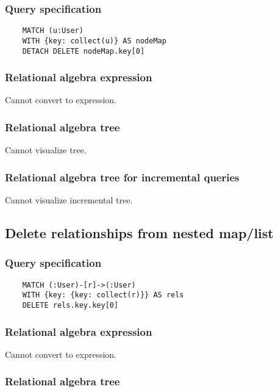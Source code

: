 	\subsubsection*{Query specification}

	\begin{lstlisting}
	MATCH (u:User)
	WITH {key: collect(u)} AS nodeMap
	DETACH DELETE nodeMap.key[0]
	\end{lstlisting}


	\subsubsection*{Relational algebra expression}

	Cannot convert to expression.

	\subsubsection*{Relational algebra tree}

	Cannot visualize tree.

	\subsubsection*{Relational algebra tree for incremental queries}

	Cannot visualize incremental tree.
	\subsection{Delete relationships from nested map/list}

	\subsubsection*{Query specification}

	\begin{lstlisting}
	MATCH (:User)-[r]->(:User)
	WITH {key: {key: collect(r)}} AS rels
	DELETE rels.key.key[0]
	\end{lstlisting}


	\subsubsection*{Relational algebra expression}

	Cannot convert to expression.

	\subsubsection*{Relational algebra tree}

